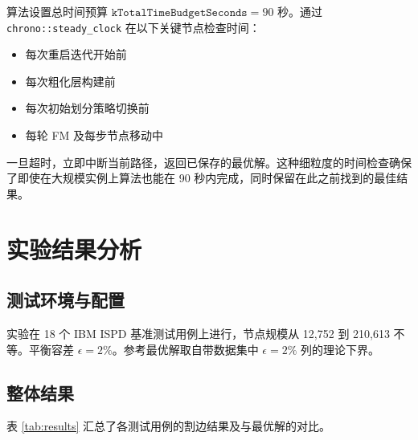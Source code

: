 \documentclass[journal, twocolumn]{IEEEtran}
\begin{document}
算法设置总时间预算 $\texttt{kTotalTimeBudgetSeconds} = 90$ 秒。通过 \texttt{chrono::steady\_clock} 在以下关键节点检查时间：

\begin{itemize}
    \item 每次重启迭代开始前
    \item 每次粗化层构建前
    \item 每次初始划分策略切换前
    \item 每轮 FM 及每步节点移动中
\end{itemize}

一旦超时，立即中断当前路径，返回已保存的最优解。这种细粒度的时间检查确保了即使在大规模实例上算法也能在 90 秒内完成，同时保留在此之前找到的最佳结果。

\section{实验结果分析}

\subsection{测试环境与配置}

实验在 18 个 IBM ISPD 基准测试用例上进行，节点规模从 12,752 到 210,613 不等。平衡容差 $\epsilon = 2\%$。参考最优解取自带数据集中 $\epsilon=2\%$ 列的理论下界。

\subsection{整体结果}

表 \ref{tab:results} 汇总了各测试用例的割边结果及与最优解的对比。
\end{document}
